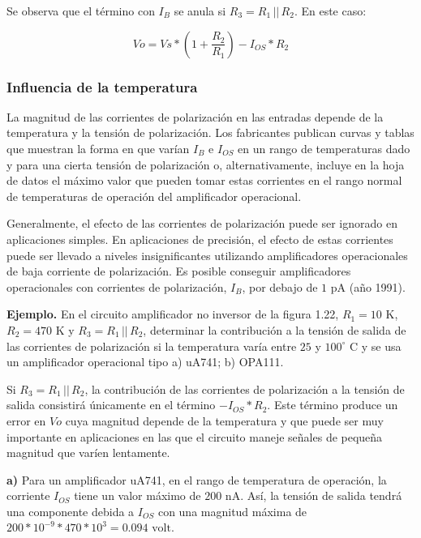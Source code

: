 \noindent Se observa que el término con $I_B$ se anula si $R_3 = R_1 \,||\, R_2$. En este caso:

\begin{equation}
	Vo = Vs * \left(1 + \frac{R_2}{R_1}\right) - I_{OS} * R_2
\end{equation}

\subsubsection{Influencia de la temperatura}
La magnitud de las corrientes de polarización en las entradas depende de la temperatura y la tensión de polarización. Los fabricantes publican curvas y tablas que muestran la forma en que varían $I_B$ e $I_{OS}$ en un rango de temperaturas dado y para una cierta tensión de polarización o, alternativamente, incluye en la hoja de datos el máximo valor que pueden tomar estas corrientes en el rango normal de temperaturas de operación del amplificador operacional.

Generalmente, el efecto de las corrientes de polarización puede ser ignorado en aplicaciones simples. En aplicaciones de precisión, el efecto de estas corrientes puede ser llevado a niveles insignificantes utilizando amplificadores operacionales de baja corriente de polarización. Es posible conseguir amplificadores operacionales con corrientes de polarización, $I_B$, por debajo de $1\text{ pA}$ (año 1991).

\textbf{Ejemplo.} En el circuito amplificador no inversor de la figura 1.22, $R_1 = 10\text{ K}$, $R_2 = 470\text{ K}$ y $R_3 = R_1 \,||\, R_2$, determinar la contribución a la tensión de salida de las corrientes de polarización si la temperatura varía entre $25$ y $100^\circ\text{ C}$ y se usa un amplificador operacional tipo a) uA741; b) OPA111.

Si $R_3 = R_1 \,||\, R_2$, la contribución de las corrientes de polarización a la tensión de salida consistirá únicamente en el término $-I_{OS} * R_2$. Este término produce un error en $Vo$ cuya magnitud depende de la temperatura y que puede ser muy importante en aplicaciones en las que el circuito maneje señales de pequeña magnitud que varíen lentamente.

\textbf{a)} Para un amplificador uA741, en el rango de temperatura de operación, la corriente $I_{OS}$ tiene un valor máximo de $200\text{ nA}$. Así, la tensión de salida tendrá una componente debida a $I_{OS}$ con una magnitud máxima de $200 * 10^{-9} * 470 * 10^3 = 0.094\text{ volt}$.

